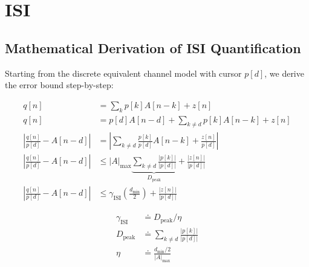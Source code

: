 \chapter{ISI}

\section{Mathematical Derivation of ISI Quantification}

Starting from the discrete equivalent channel model with cursor $p[d]$, we derive the error bound step-by-step:

\begin{align}
    q[n]        &= \sum_{k} p[k] A[n-k] + z[n] \\
    q[n]        &= p[d] A[n-d] + \sum_{k \neq d} p[k] A[n-k] + z[n] \\
    \left| \frac{q[n]}{p[d]} - A[n-d] \right| &= \left| \sum_{k \neq d} \frac{p[k]}{p[d]} A[n-k] + \frac{z[n]}{p[d]} \right| \\
    \left| \frac{q[n]}{p[d]} - A[n-d] \right| &\le |A|_{\text{max}} \underbrace{\sum_{k \neq d} \frac{|p[k]|}{|p[d]|}}_{D_{\text{peak}}} + \frac{|z[n]|}{|p[d]|} \\
    \left|\frac{q[n]}{p[d]} - A[n-d] \right| &\le \gamma_{\text{ISI}} \left( \frac{d_{\text{min}}}{2} \right) + \frac{|z[n]|}{|p[d]|}
\end{align}


\begin{align}
\gamma_{\text{ISI}} &\doteq D_{\text{peak}} / \eta\\
D_{\text{peak}} &\doteq \sum_{k \neq d} \frac{|p[k]|}{|p[d]|} \\
\eta &\doteq \frac{d_{\text{min}}/2}{|A|_{\text{max}}}
\end{align}

